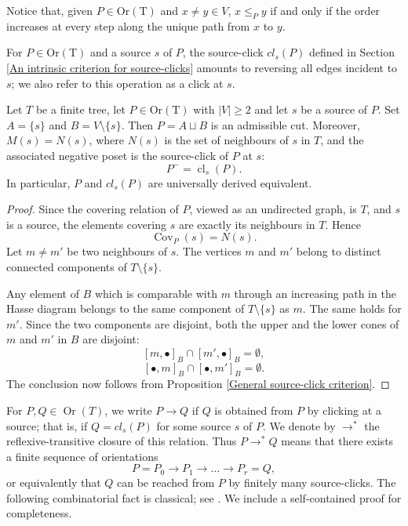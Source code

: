     Notice that, given $P \in \operatorname{Or(T)}$ and $x \neq y \in V$, $x \leq_Py$ if and only if the order increases at every step along the unique path from $x$ to $y$. 

For $P \in \operatorname{Or(T)}$ and a source $s$ of $P$, the source-click $cl_s(P)$ defined in Section \ref{An intrinsic criterion for source-clicks} amounts to reversing all edges incident to $s$; we also refer to this operation as a click at $s$.

\begin{corollary}%
\label{Source step}
Let $T$ be a finite tree, let $P \in \operatorname{Or(T)}$ with $|V| \geq 2$ and let $s$ be a source of $P$. Set $A=\{s\}$ and $B=V \setminus \{s\}$. Then $P=A \sqcup B$ is an admissible cut. Moreover, $M(s)=N(s)$, where $N(s)$ is the set of neighbours of $s$ in $T$, and the associated negative poset is the source-click of $P$ at $s$: \[P^-=\operatorname{cl}_s(P).\] In particular, $P$ and $cl_s(P)$ are universally derived equivalent.   
\end{corollary}

\begin{proof}
    Since the covering relation of $P$, viewed as an undirected graph, is $T$, and $s$ is a source, the elements covering $s$ are exactly its neighbours in $T$. Hence
    \[\operatorname{Cov}_P(s)=N(s).\] 
    Let $m \neq m'$ be two neighbours of $s$. The vertices $m$ and $m'$ belong to distinct connected components of $T \setminus \{s\}$. 

    Any element of $B$ which is comparable with $m$ through an increasing path in the Hasse diagram belongs to the same component of $T \setminus \{s\}$ as $m$. The same holds for $m'$. Since the two components are disjoint, both the upper and the lower cones of $m$
 and $m'$ in $B$ are disjoint:
\[[m, \bullet]_B \cap [m', \bullet]_B= \emptyset,\]
\[[\bullet, m]_B \cap [\bullet,m']_B= \emptyset.\] The conclusion now follows from Proposition \ref{General source-click criterion}.
\end{proof}
For $P,Q \in \operatorname{Or}(T)$, we write $P \to Q$ if $Q$ is obtained from $P$ by clicking at a source; that is, if $Q=cl_s(P)$ for some source $s$ of $P$. We denote by $\to ^*$ the reflexive-transitive closure of this relation. Thus $P \to ^*Q$ means that there exists a finite sequence of orientations \[P=P_0 \to P_1 \to \dots \to P_r=Q,\] or equivalently that $Q$ can be reached from $P$ by finitely many source-clicks.
The following combinatorial fact is classical; see \cite{BGP}. We include a self-contained proof for completeness.

